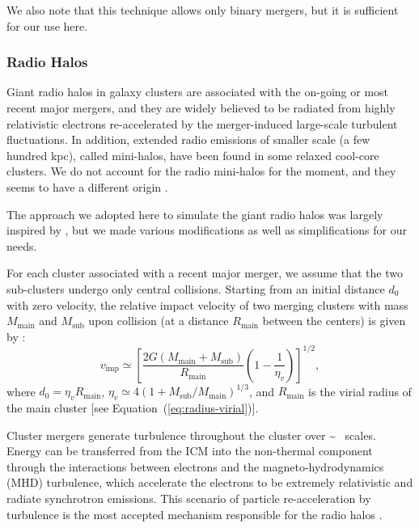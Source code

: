 \documentclass[modern]{aastex61}
\newcommand{\R}[1]{\mathrm{#1}}
\begin{document}
We also note that this technique allows only binary mergers,
but it is sufficient for our use here.


\subsubsection{Radio Halos}
\label{sec:halo}

Giant radio halos in galaxy clusters are associated with the on-going or
most recent major mergers, and they are widely believed to be radiated from
highly relativistic electrons re-accelerated by the merger-induced
large-scale turbulent fluctuations.
In addition, extended radio emissions of smaller scale (a few hundred kpc),
called mini-halos, have been found in some relaxed cool-core clusters.
We do not account for the radio mini-halos for the moment, and they
seems to have a different origin \citep{feretti2012rev}.

The approach we adopted here to simulate the giant radio halos
was largely inspired by \citet{cassano2005}, but we
made various modifications as well as simplifications for our needs.

For each cluster associated with a recent major merger, we assume that
the two sub-clusters undergo only central collisions.
Starting from an initial distance $d_0$ with zero velocity,
the relative impact velocity of two merging clusters with mass
$M_{\R{main}}$ and $M_{\R{sub}}$ upon collision (at a distance
$R_{\R{main}}$ between the centers) is given by
\citep{cassano2005,sarazin2002}:
\begin{equation}
  \label{eq:v-imp}
  v_{\R{imp}} \simeq \left[
    \frac{2G (M_{\R{main}} + M_{\R{sub}})}{R_{\R{main}}}
    \left( 1 - \frac{1}{\eta_v} \right)\right]^{1/2},
\end{equation}
where $d_0 = \eta_v R_{\R{main}}$,
$\eta_v \simeq 4 (1 + M_{\R{sub}}/M_{\R{main}})^{1/3}$,
and $R_{\R{main}}$ is the virial radius of the main cluster
[see Equation~(\ref{eq:radius-virial})].

Cluster mergers generate turbulence throughout the cluster over
\si{\sim \Mpc} scales.
Energy can be transferred from the ICM into the non-thermal
component through the interactions between electrons and the
magneto-hydrodynamics (MHD) turbulence, which accelerate the electrons
to be extremely relativistic and radiate synchrotron emissions.
This scenario of particle re-acceleration by turbulence is the most
accepted mechanism responsible for the radio halos \citep{feretti2012rev}.
\end{document}
